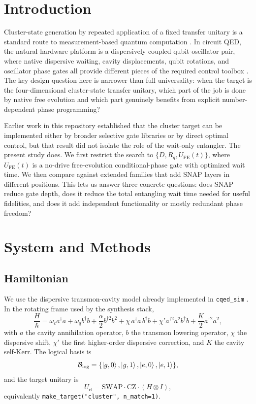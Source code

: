 \documentclass[aps,pra,twocolumn,reprint,amsmath,amssymb]{revtex4-2}
\begin{document}
\section{Introduction}
Cluster-state generation by repeated application of a fixed transfer unitary is
a standard route to measurement-based quantum computation
\cite{raussendorf2001one}. In circuit QED, the natural hardware platform is a
dispersively coupled qubit-oscillator pair, where native dispersive waiting,
cavity displacements, qubit rotations, and oscillator phase gates all provide
different pieces of the required control toolbox \cite{blais2021circuit,
heeres2015snap,krastanov2015universal,eickbusch2022ecd}. The key design
question here is narrower than full universality: when the target is the
four-dimensional cluster-state transfer unitary, which part of the job is done
by native free evolution and which part genuinely benefits from explicit
number-dependent phase programming?

Earlier work in this repository established that the cluster target can be
implemented either by broader selective gate libraries or by direct optimal
control, but that result did not isolate the role of the wait-only entangler.
The present study does. We first restrict the search to
$\{D,R_q,U_{\mathrm{FE}}(t)\}$, where $U_{\mathrm{FE}}(t)$ is a no-drive
free-evolution conditional-phase gate with optimized wait time. We then compare
against extended families that add SNAP layers in different positions. This lets
us answer three concrete questions: does SNAP reduce gate depth, does it reduce
the total entangling wait time needed for useful fidelities, and does it add
independent functionality or mostly redundant phase freedom?

\section{System and Methods}
\subsection{Hamiltonian}
We use the dispersive transmon-cavity model already implemented in
\texttt{cqed\_sim} \cite{cqedsim}. In the rotating frame used by the synthesis
stack,
\begin{equation}
\frac{H}{\hbar} =
\omega_c a^\dagger a + \omega_q b^\dagger b
+ \frac{\alpha}{2} b^{\dagger 2} b^2
+ \chi\, a^\dagger a\, b^\dagger b
+ \chi' a^{\dagger 2} a^2 b^\dagger b
+ \frac{K}{2} a^{\dagger 2} a^2 ,
\end{equation}
with $a$ the cavity annihilation operator, $b$ the transmon lowering operator,
$\chi$ the dispersive shift, $\chi'$ the first higher-order dispersive
correction, and $K$ the cavity self-Kerr. The logical basis is
\begin{equation}
\mathcal{B}_{\mathrm{log}} =
\{\ket{g,0},\ket{g,1},\ket{e,0},\ket{e,1}\},
\end{equation}
and the target unitary is
\begin{equation}
U_{\mathrm{cl}} = \mathrm{SWAP}\cdot\mathrm{CZ}\cdot(H\otimes I),
\end{equation}
equivalently \texttt{make\_target("cluster", n\_match=1)}.
\end{document}
